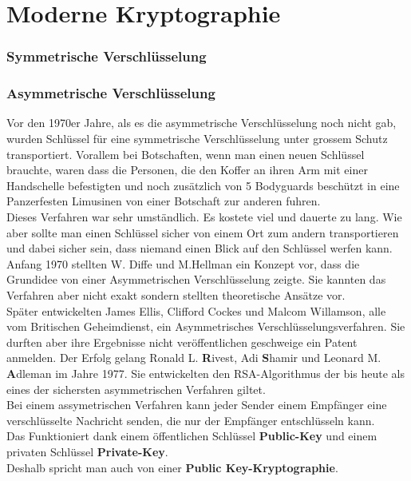 \section{Moderne Kryptographie}
\subsubsection{Symmetrische Verschlüsselung}
\subsubsection{Asymmetrische Verschlüsselung}
Vor den 1970er Jahre, als es die asymmetrische Verschlüsselung noch nicht gab, wurden Schlüssel für eine symmetrische Verschlüsselung unter grossem Schutz transportiert.
Vorallem bei Botschaften, wenn man einen neuen Schlüssel brauchte, waren dass die Personen, die den Koffer an ihren Arm mit einer Handschelle befestigten und noch zusätzlich von 5 Bodyguards beschützt in eine Panzerfesten Limusinen von einer Botschaft zur anderen fuhren.\\
Dieses Verfahren war sehr umständlich. Es kostete viel und dauerte zu lang. Wie aber sollte man einen Schlüssel sicher von einem Ort zum andern transportieren und dabei sicher sein, dass niemand einen Blick auf den Schlüssel werfen kann.\\
Anfang 1970 stellten W. Diffe und M.Hellman ein Konzept vor, dass die Grundidee von einer Asymmetrischen Verschlüsselung zeigte. Sie kannten das Verfahren aber nicht exakt sondern stellten theoretische Ansätze vor.\\
Später entwickelten James Ellis, Clifford Cockes und Malcom Willamson, alle vom Britischen Geheimdienst, ein Asymmetrisches Verschlüsselungsverfahren. Sie durften aber ihre Ergebnisse nicht veröffentlichen geschweige ein Patent anmelden. 
Der Erfolg gelang Ronald L. \textbf{R}ivest, Adi \textbf{S}hamir und Leonard M. \textbf{A}dleman im Jahre 1977. Sie entwickelten den RSA-Algorithmus der bis heute als eines der sichersten asymmetrischen Verfahren giltet.\\[2ex]
%
Bei einem assymetrischen Verfahren kann jeder Sender einem Empfänger eine verschlüsselte Nachricht senden, die nur der Empfänger entschlüsseln kann.\\
%
Das Funktioniert dank einem öffentlichen Schlüssel \textbf{Public-Key} und einem privaten Schlüssel \textbf{Private-Key}. \\
Deshalb spricht man auch von einer  \textbf{Public Key-Kryptographie}.
%
